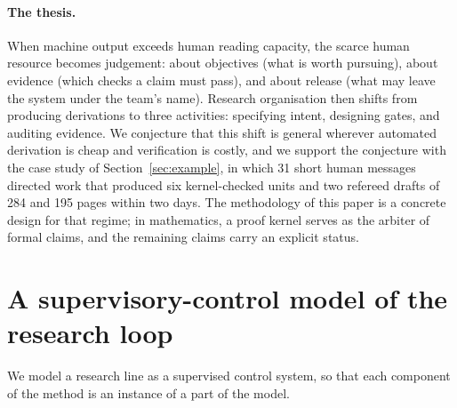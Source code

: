 \documentclass[11pt]{article}
\begin{document}
\paragraph{The thesis.} When machine output exceeds human reading capacity,
the scarce human resource becomes judgement: about objectives (what is worth
pursuing), about evidence (which checks a claim must pass), and about release
(what may leave the system under the team's name). Research organisation then
shifts from producing derivations to three activities: specifying intent,
designing gates, and auditing evidence. We conjecture that this shift is
general wherever automated derivation is cheap and verification is costly,
and we support the conjecture with the case study of
Section~\ref{sec:example}, in which 31 short human messages directed work that
produced six kernel-checked units and two refereed drafts of 284 and 195
pages within two days. The methodology of this paper is a concrete design for that regime; in
mathematics, a proof kernel serves as the arbiter of formal claims, and the
remaining claims carry an explicit status.

\section{A supervisory-control model of the research loop}
\label{sec:model}
We model a research line as a supervised control system, so that each
component of the method is an instance of a part of the model.
\end{document}
